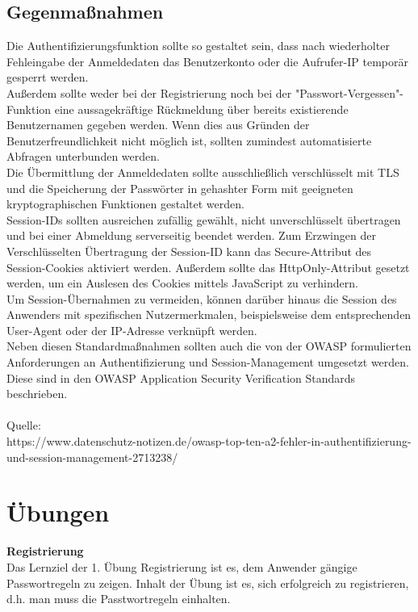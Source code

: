 \subsection{Gegenmaßnahmen}
Die Authentifizierungsfunktion sollte so gestaltet sein, dass nach wiederholter Fehleingabe der Anmeldedaten das Benutzerkonto oder die Aufrufer-IP temporär gesperrt werden.\\
Außerdem sollte weder bei der Registrierung noch bei der "Passwort-Vergessen"-Funktion eine aussagekräftige Rückmeldung über bereits existierende Benutzernamen gegeben werden. Wenn dies aus Gründen der Benutzerfreundlichkeit nicht möglich ist, sollten zumindest automatisierte Abfragen unterbunden werden.\\
Die Übermittlung der Anmeldedaten sollte ausschließlich verschlüsselt mit TLS und die Speicherung der Passwörter in gehashter Form mit geeigneten kryptographischen Funktionen gestaltet werden.\\
Session-IDs sollten ausreichen zufällig gewählt, nicht unverschlüsselt übertragen und bei einer Abmeldung serverseitig beendet werden. Zum Erzwingen der Verschlüsselten Übertragung der Session-ID kann das Secure-Attribut des Session-Cookies aktiviert werden. Außerdem sollte das HttpOnly-Attribut gesetzt werden, um ein Auslesen des Cookies mittels JavaScript zu verhindern.\\
Um Session-Übernahmen zu vermeiden, können darüber hinaus die Session des Anwenders mit spezifischen Nutzermerkmalen, beispielsweise dem entsprechenden User-Agent oder der IP-Adresse verknüpft werden.\\
Neben diesen Standardmaßnahmen sollten auch die von der OWASP formulierten Anforderungen an Authentifizierung und Session-Management umgesetzt werden. Diese sind in den OWASP Application Security Verification Standards beschrieben.\\
\\
Quelle:\\ https://www.datenschutz-notizen.de/owasp-top-ten-a2-fehler-in-authentifizierung-und-session-management-2713238/

\section{Übungen}
\textbf{Registrierung}\\
Das Lernziel der 1. Übung Registrierung ist es, dem Anwender gängige Passwortregeln zu zeigen. Inhalt der Übung ist es, sich erfolgreich zu registrieren, d.h. man muss die Passtwortregeln einhalten.

